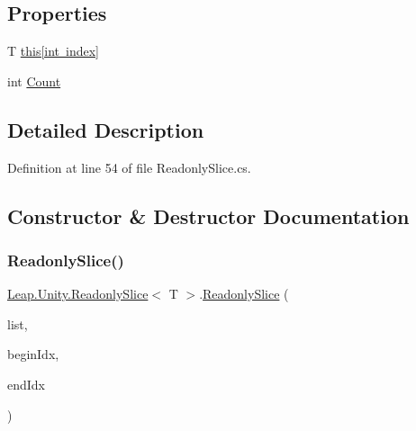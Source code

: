 \subsection*{Properties}
\begin{DoxyCompactItemize}
\item 
T \mbox{\hyperlink{struct_leap_1_1_unity_1_1_readonly_slice_a9e8ee19db4c079a22b2e4f3640532280}{this\mbox{[}int index\mbox{]}}}
\item 
int \mbox{\hyperlink{struct_leap_1_1_unity_1_1_readonly_slice_ade11ab84f8518b7dd6d27b2e4b69e6eb}{Count}}
\end{DoxyCompactItemize}


\subsection{Detailed Description}


Definition at line 54 of file Readonly\+Slice.\+cs.



\subsection{Constructor \& Destructor Documentation}
\mbox{\label{struct_leap_1_1_unity_1_1_readonly_slice_a67460191081a7c77a2a715a7b61d80a1}} 
\subsubsection{\texorpdfstring{ReadonlySlice()}{ReadonlySlice()}}
{\footnotesize\ttfamily \mbox{\hyperlink{struct_leap_1_1_unity_1_1_readonly_slice}{Leap.\+Unity.\+Readonly\+Slice}}$<$ T $>$.\mbox{\hyperlink{struct_leap_1_1_unity_1_1_readonly_slice}{Readonly\+Slice}} (\begin{DoxyParamCaption}\item[{\mbox{\hyperlink{struct_leap_1_1_unity_1_1_readonly_list}{Readonly\+List}}$<$ T $>$}]{list,  }\item[{int}]{begin\+Idx,  }\item[{int}]{end\+Idx }\end{DoxyParamCaption})}



